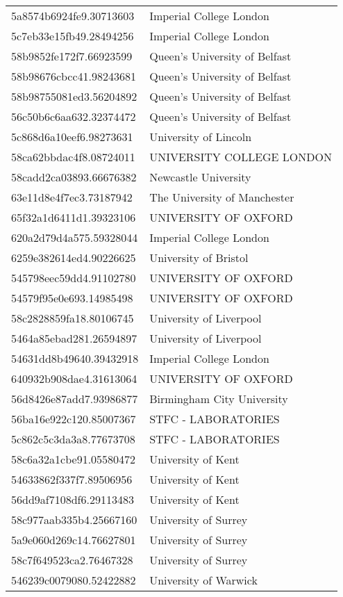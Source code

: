 \begin{tabular}{ll}
5a8574b6924fe9.30713603 & Imperial College London \\
5c7eb33e15fb49.28494256 & Imperial College London \\
58b9852fe172f7.66923599 & Queen's University of Belfast \\
58b98676cbcc41.98243681 & Queen's University of Belfast \\
58b98755081ed3.56204892 & Queen's University of Belfast \\
56c50b6c6aa632.32374472 & Queen's University of Belfast \\
5c868d6a10eef6.98273631 & University of Lincoln \\
58ca62bbdac4f8.08724011 & UNIVERSITY COLLEGE LONDON \\
58cadd2ca03893.66676382 & Newcastle University \\
63e11d8e4f7ec3.73187942 & The University of Manchester \\
65f32a1d6411d1.39323106 & UNIVERSITY OF OXFORD \\
620a2d79d4a575.59328044 & Imperial College London \\
6259e382614ed4.90226625 & University of Bristol \\
545798eec59dd4.91102780 & UNIVERSITY OF OXFORD \\
54579f95e0e693.14985498 & UNIVERSITY OF OXFORD \\
58c2828859fa18.80106745 & University of Liverpool \\
5464a85ebad281.26594897 & University of Liverpool \\
54631dd8b49640.39432918 & Imperial College London \\
640932b908dae4.31613064 & UNIVERSITY OF OXFORD \\
56d8426e87add7.93986877 & Birmingham City University \\
56ba16e922c120.85007367 & STFC - LABORATORIES \\
5c862c5c3da3a8.77673708 & STFC - LABORATORIES \\
58c6a32a1cbe91.05580472 & University of Kent \\
54633862f337f7.89506956 & University of Kent \\
56dd9af7108df6.29113483 & University of Kent \\
58c977aab335b4.25667160 & University of Surrey \\
5a9e060d269c14.76627801 & University of Surrey \\
58c7f649523ca2.76467328 & University of Surrey \\
546239c0079080.52422882 & University of Warwick \\

\end{tabular}
